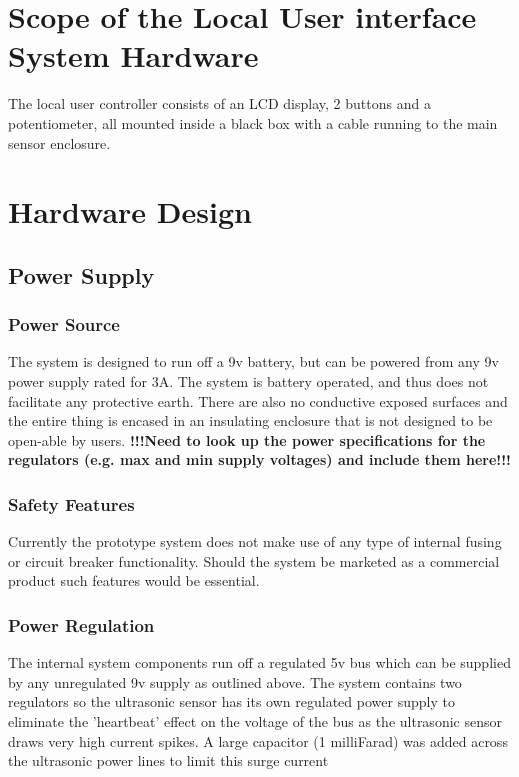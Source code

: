 \documentclass[]{report}
\begin{document}
\section{Scope of the Local User interface System Hardware}
The local user controller consists of an LCD display, 2 buttons and a potentiometer, all mounted inside a black box with a cable running to the main sensor enclosure.

\section{Hardware Design}
\subsection{Power Supply}
\subsubsection{Power Source}

The system is designed to run off a 9v battery, but can be powered from any 9v power supply rated for 3A. The system is battery operated, and thus does not facilitate any protective earth. There are also no conductive exposed surfaces and the entire thing is encased in an insulating enclosure that is not designed to be open-able by users. \newline
\textbf{!!!Need to look up the power specifications for the regulators (e.g. max and min supply voltages) and include them here!!!}

\subsubsection{Safety Features}
Currently the prototype system does not make use of any type of internal fusing or circuit breaker functionality. Should the system be marketed as a commercial product such features would be essential.

\subsubsection{Power Regulation}
The internal system components run off a regulated 5v bus which can be supplied by any unregulated 9v supply as outlined above. The system contains two regulators so the ultrasonic sensor has its own regulated power supply to eliminate the 'heartbeat' effect on the voltage of the bus as the ultrasonic sensor draws very high current spikes.  A large capacitor (1 milliFarad) was added across the ultrasonic power lines to limit this surge current \newline
\end{document}
